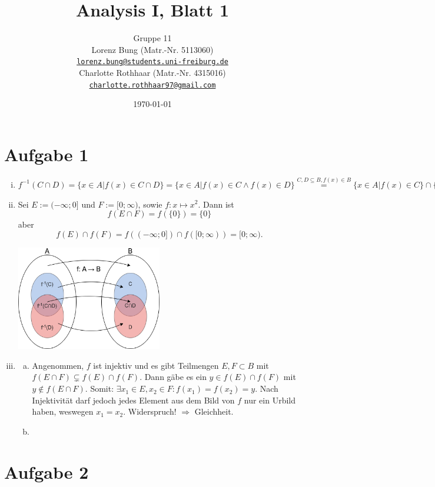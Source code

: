 \documentclass[12pt,a4paper]{article}
\title{Analysis I, Blatt 1}
\author{
    Gruppe 11\\
    Lorenz Bung (Matr.-Nr. 5113060)\\
    \href{mailto:lorenz.bung@students.uni-freiburg.de}{\texttt{lorenz.bung@students.uni-freiburg.de}}\\
    Charlotte Rothhaar (Matr.-Nr. 4315016)\\
    \href{mailto:charlotte.rothhaar97@gmail.com}{\texttt{charlotte.rothhaar97@gmail.com}}
}
\date{\today}
\begin{document}
\maketitle


\section*{Aufgabe 1}

\begin{enumerate}[(i)]
    \item $f^{-1}(C \cap D) = \{x \in A | f(x) \in C \cap D\} = \{x \in A | f(x) \in C \wedge f(x) \in D\} \overset{C,D \subseteq B, f(x) \in B}{=} \{x \in A | f(x) \in C\} \cap \{x \in A | f(x) \in D\} = f^{-1}(C) \cap f^{-1}(D).$
    \item Sei $E := (- \infty; 0]$ und $F := [0; \infty)$, sowie $f: x \mapsto x^2$. Dann ist $$f(E \cap F) = f(\{0\}) = \{0\}$$ aber $$f(E) \cap f(F) = f((- \infty; 0]) \cap f([0; \infty)) = [0; \infty).$$
    \begin{minipage}[h]{\textwidth}
        \centering
        \includegraphics[width=0.5\textwidth]{Diagramm.png}
    \end{minipage}
    \item \begin{enumerate}[(a)]
        \item Angenommen, $f$ ist injektiv und es gibt Teilmengen $E, F \subset B$ mit $f(E \cap F) \subsetneq f(E) \cap f(F)$.
        Dann gäbe es ein $y \in f(E) \cap f(F)$ mit $y \notin f(E \cap F)$.
        Somit: $\exists x_1 \in E, x_2 \in F: f(x_1) = f(x_2) = y$.
        Nach Injektivität darf jedoch jedes Element aus dem Bild von $f$ nur ein Urbild haben, weswegen $x_1 = x_2$.
        Widerspruch! $\Rightarrow$ Gleichheit.
        \item
    \end{enumerate}
\end{enumerate}


\section*{Aufgabe 2}
\end{document}
